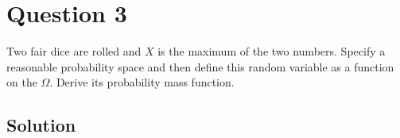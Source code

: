 \section*{Question 3}

Two fair dice are rolled and \( X \) is the maximum of the two numbers.
Specify a reasonable probability space and then define this random variable as a function on the \( \Omega \).
Derive its probability mass function.

\subsection*{Solution}
